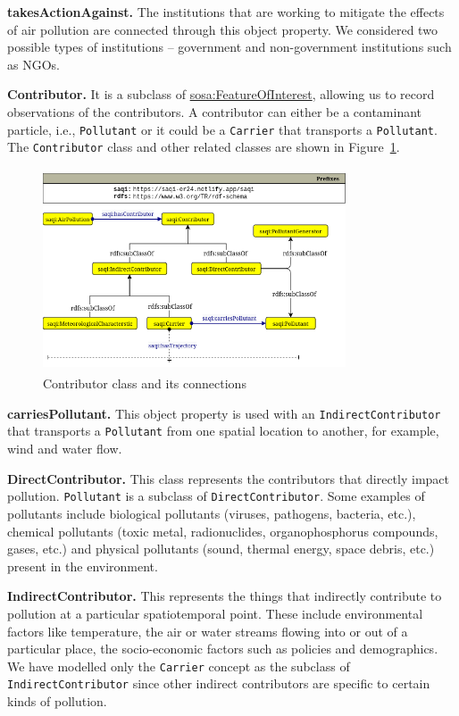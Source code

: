 \textbf{takesActionAgainst.} The institutions that are working to mitigate the effects of air pollution are connected through this object property. We considered two possible types of institutions -- government and non-government institutions such as NGOs. %

\textbf{Contributor.} It is a subclass of \href{http://www.w3.org/ns/sosa/FeatureOfInterest}{sosa:FeatureOfInterest},  allowing us to record observations of the contributors. A contributor can either be a contaminant particle, i.e., \texttt{Pollutant} or it could be a \texttt{Carrier} that transports a \texttt{Pollutant}. The \texttt{Contributor} class and other related classes are shown in Figure~\ref{fig:contributor_concepts}.

\begin{figure}[ht]
\centering
\includegraphics[height=6cm, width=0.80\textwidth]{figures/contrib_new.png}
\caption{Contributor class and its connections} 
\label{fig:contributor_concepts}
\end{figure}

\textbf{carriesPollutant.} This object property is used with an  \texttt{IndirectContributor} that transports a \texttt{Pollutant} from one spatial location to another, for example, wind and water flow.

\textbf{DirectContributor.} This class represents the contributors that directly impact pollution. \texttt{Pollutant} is a subclass of \texttt{Direct\-Contributor}. Some examples of pollutants include biological pollutants (viruses, pathogens, bacteria, etc.), chemical pollutants (toxic metal, radionuclides, organophosphorus compounds, gases, etc.) and physical pollutants (sound, thermal energy, space debris, etc.) present in the environment. 

\textbf{IndirectContributor.} This represents the things that indirectly contribute to pollution at a particular spatiotemporal point. These include environmental factors like temperature, the air or water streams flowing into or out of a particular place, the socio-economic factors such as policies and demographics. We have modelled only the \texttt{Carrier} concept as the subclass of \texttt{IndirectContributor} since other indirect contributors are specific to certain kinds of pollution.

